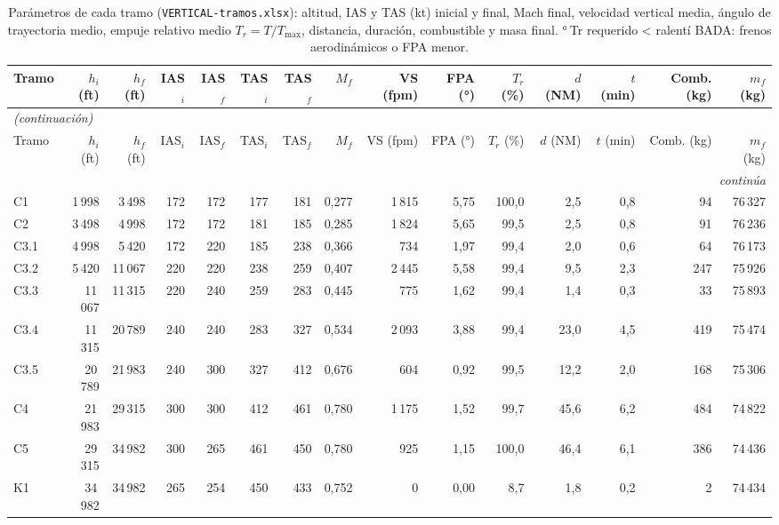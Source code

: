 \begingroup\scriptsize\setlength{\tabcolsep}{2.8pt}
\begin{longtable}{lrrrrrrrrrrrrrr}
\caption{Parámetros de cada tramo (\texttt{VERTICAL-tramos.xlsx}): altitud, IAS y TAS (kt) inicial y final, Mach final, velocidad vertical media, ángulo de trayectoria medio, empuje relativo medio $T_r=T/T_{\max}$, distancia, duración, combustible y masa final. $^{a}$\,Tr requerido < ralentí BADA: frenos aerodinámicos o FPA menor.}\label{tab:vnum}\\
\toprule
Tramo & $h_i$ (ft) & $h_f$ (ft) & IAS$_i$ & IAS$_f$ & TAS$_i$ & TAS$_f$ & $M_f$ & VS (fpm) & FPA (°) & $T_r$ (\%) & $d$ (NM) & $t$ (min) & Comb. (kg) & $m_f$ (kg)\\
\midrule
\endfirsthead
\multicolumn{15}{l}{\small\itshape (continuación)}\\
\toprule
Tramo & $h_i$ (ft) & $h_f$ (ft) & IAS$_i$ & IAS$_f$ & TAS$_i$ & TAS$_f$ & $M_f$ & VS (fpm) & FPA (°) & $T_r$ (\%) & $d$ (NM) & $t$ (min) & Comb. (kg) & $m_f$ (kg)\\
\midrule
\endhead
\midrule
\multicolumn{15}{r}{\small\itshape continúa}\\
\endfoot
\bottomrule
\endlastfoot
C1 & 1\,998 & 3\,498 & 172 & 172 & 177 & 181 & 0,277 & 1\,815 & 5,75 & 100,0 & 2,5 & 0,8 & 94 & 76\,327\\
C2 & 3\,498 & 4\,998 & 172 & 172 & 181 & 185 & 0,285 & 1\,824 & 5,65 & 99,5 & 2,5 & 0,8 & 91 & 76\,236\\
C3.1 & 4\,998 & 5\,420 & 172 & 220 & 185 & 238 & 0,366 & 734 & 1,97 & 99,4 & 2,0 & 0,6 & 64 & 76\,173\\
C3.2 & 5\,420 & 11\,067 & 220 & 220 & 238 & 259 & 0,407 & 2\,445 & 5,58 & 99,4 & 9,5 & 2,3 & 247 & 75\,926\\
C3.3 & 11\,067 & 11\,315 & 220 & 240 & 259 & 283 & 0,445 & 775 & 1,62 & 99,4 & 1,4 & 0,3 & 33 & 75\,893\\
C3.4 & 11\,315 & 20\,789 & 240 & 240 & 283 & 327 & 0,534 & 2\,093 & 3,88 & 99,4 & 23,0 & 4,5 & 419 & 75\,474\\
C3.5 & 20\,789 & 21\,983 & 240 & 300 & 327 & 412 & 0,676 & 604 & 0,92 & 99,5 & 12,2 & 2,0 & 168 & 75\,306\\
C4 & 21\,983 & 29\,315 & 300 & 300 & 412 & 461 & 0,780 & 1\,175 & 1,52 & 99,7 & 45,6 & 6,2 & 484 & 74\,822\\
C5 & 29\,315 & 34\,982 & 300 & 265 & 461 & 450 & 0,780 & 925 & 1,15 & 100,0 & 46,4 & 6,1 & 386 & 74\,436\\
K1 & 34\,982 & 34\,982 & 265 & 254 & 450 & 433 & 0,752 & 0 & 0,00 & 8,7 & 1,8 & 0,2 & 2 & 74\,434\\

\end{longtable}
